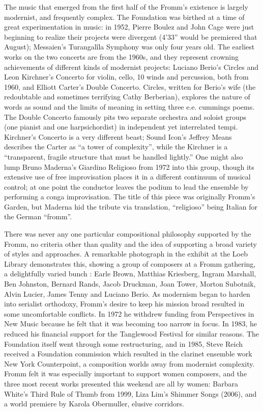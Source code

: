 The music that emerged from the first half of the Fromm’s existence is largely modernist, and frequently complex. The Foundation was birthed at a time of great experimentation in music: in 1952, Pierre Boulez and John Cage were just beginning to realize their projects were divergent (4’33” would be premiered that August); Messaien’s Turangalîla Symphony was only four years old. The earliest works on the two concerts are from the 1960s, and they represent crowning achievements of different kinds of modernist projects: Luciano Berio’s Circles and Leon Kirchner’s Concerto for violin, cello, 10 winds and percussion, both from 1960, and Elliott Carter’s Double Concerto. Circles, written for Berio’s wife (the redoubtable and sometimes terrifying Cathy Berberian), explores the nature of words as sound and the limits of meaning in setting three e.e. cummings poems. The Double Concerto famously pits two separate orchestra and soloist groups (one pianist and one harpsichordist) in independent yet interrelated tempi. Kirchner’s Concerto is a very different beast; Sound Icon’s Jeffrey Means describes the Carter as “a tower of complexity”, while the Kirchner is a “transparent, fragile structure that must be handled lightly.” One might also lump Bruno Maderna’s Giardino Religioso from 1972 into this group, though its extensive use of free improvisation places it in a different continuum of musical control; at one point the conductor leaves the podium to lead the ensemble by performing a conga improvisation. The title of this piece was originally Fromm’s Garden, but Maderna hid the tribute via translation, “religioso” being Italian for the German “fromm”.

There was never any one particular compositional philosophy supported by the Fromm, no criteria other than quality and the idea of supporting a broad variety of styles and approaches. A remarkable photograph in the exhibit at the Loeb Library demonstrates this, showing a group of composers at a Fromm gathering, a delightfully varied bunch : Earle Brown, Matthias Kriesberg, Ingram Marshall, Ben Johnston, Bernard Rands, Jacob Druckman, Joan Tower, Morton Subotnik, Alvin Lucier, James Tenny and Luciano Berio. As modernism began to harden into serialist orthodoxy, Fromm’s desire to keep his mission broad resulted in some uncomfortable conflicts. In 1972 he withdrew funding from Perspectives in New Music because he felt that it was becoming too narrow in focus. In 1983, he reduced his financial support for the Tanglewood Festival for similar reasons. The Foundation itself went through some restructuring, and in 1985, Steve Reich received a Foundation commission which resulted in the clarinet ensemble work New York Counterpoint, a composition worlds away from modernist complexity. Fromm felt it was especially important to support women composers, and the three most recent works presented this weekend are all by women: Barbara White’s Third Rule of Thumb from 1999, Liza Lim’s Shimmer Songs (2006), and a world premiere by Karola Obermuller, elusive corridors.


